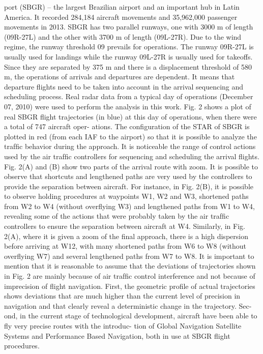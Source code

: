 \documentclass{aer1315-pretty}
\begin{document}
\begin{itemize}
port (SBGR) – the largest Brazilian airport and an important hub in Latin America. It recorded 284,184 aircraft movements
and 35,962,000 passenger movements in 2013. SBGR has two parallel runways, one with 3000 m of length (09R-27L) and the
other with 3700 m of length (09L-27R). Due to the wind regime, the runway threshold 09 prevails for operations. The runway
09R-27L is usually used for landings while the runway 09L-27R is usually used for takeoffs. Since they are separated by
375 m and there is a displacement threshold of 580 m, the operations of arrivals and departures are dependent. It means
that departure ﬂights need to be taken into account in the arrival sequencing and scheduling process.
    Real radar data from a typical day of operations (December 07, 2010) were used to perform the analysis in this work. Fig. 2
shows a plot of real SBGR ﬂight trajectories (in blue) at this day of operations, when there were a total of 747 aircraft oper-
ations. The conﬁguration of the STAR of SBGR is plotted in red (from each IAF to the airport) so that it is possible to analyze
the trafﬁc behavior during the approach. It is noticeable the range of control actions used by the air trafﬁc controllers for
sequencing and scheduling the arrival ﬂights. Fig. 2(A) and (B) show two parts of the arrival route with zoom. It is possible
to observe that shortcuts and lengthened paths are very used by the controllers to provide the separation between aircraft.
For instance, in Fig. 2(B), it is possible to observe holding procedures at waypoints W1, W2 and W3, shortened paths from
W2 to W4 (without overﬂying W3) and lengthened paths from W1 to W4, revealing some of the actions that were probably
taken by the air trafﬁc controllers to ensure the separation between aircraft at W4. Similarly, in Fig. 2(A), where it is given a
zoom of the ﬁnal approach, there is a high dispersion before arriving at W12, with many shortened paths from W6 to W8
(without overﬂying W7) and several lengthened paths from W7 to W8. It is important to mention that it is reasonable to
assume that the deviations of trajectories shown in Fig. 2 are mainly because of air trafﬁc control interference and not
because of imprecision of ﬂight navigation. First, the geometric proﬁle of actual trajectories shows deviations that are much
higher than the current level of precision in navigation and that clearly reveal a deterministic change in the trajectory. Sec-
ond, in the current stage of technological development, aircraft have been able to ﬂy very precise routes with the introduc-
tion of Global Navigation Satellite Systems and Performance Based Navigation, both in use at SBGR ﬂight procedures.






\end{itemize}
\end{document}

